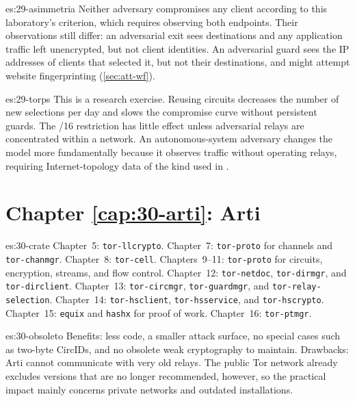 \begin{soluzione}{es:29-asimmetria}
Neither adversary compromises any client according to this laboratory's criterion, which requires observing both endpoints. Their observations still differ: an adversarial exit sees destinations and any application traffic left unencrypted, but not client identities. An adversarial guard sees the IP addresses of clients that selected it, but not their destinations, and might attempt website fingerprinting (\cref{sec:att-wf}).
\end{soluzione}

\begin{soluzione}{es:29-torps}
This is a research exercise. Reusing circuits decreases the number of new selections per day and slows the compromise curve without persistent guards. The /16 restriction has little effect unless adversarial relays are concentrated within a network. An autonomous-system adversary changes the model more fundamentally because it observes traffic without operating relays, requiring Internet-topology data of the kind used in \cite{johnson2013users}.
\end{soluzione}

\section*{Chapter \ref{cap:30-arti}: Arti}

\begin{soluzione}{es:30-crate}
Chapter~5: \texttt{tor-llcrypto}. Chapter~7: \texttt{tor-proto} for channels and \texttt{tor-chanmgr}. Chapter~8: \texttt{tor-cell}. Chapters~9--11: \texttt{tor-proto} for circuits, encryption, streams, and flow control. Chapter~12: \texttt{tor-netdoc}, \texttt{tor-dirmgr}, and \texttt{tor-dirclient}. Chapter~13: \texttt{tor-circmgr}, \texttt{tor-guardmgr}, and \texttt{tor-relay-selection}. Chapter~14: \texttt{tor-hsclient}, \texttt{tor-hsservice}, and \texttt{tor-hscrypto}. Chapter~15: \texttt{equix} and \texttt{hashx} for proof of work. Chapter~16: \texttt{tor-ptmgr}.
\end{soluzione}

\begin{soluzione}{es:30-obsoleto}
Benefits: less code, a smaller attack surface, no special cases such as two-byte CircIDs, and no obsolete weak cryptography to maintain. Drawbacks: Arti cannot communicate with very old relays. The public Tor network already excludes versions that are no longer recommended, however, so the practical impact mainly concerns private networks and outdated installations.
\end{soluzione}

